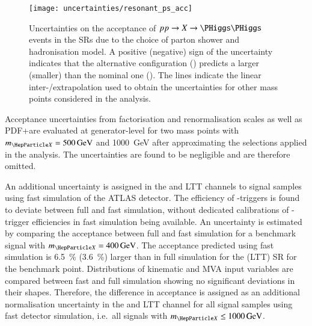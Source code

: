 
\begin{figure}[htbp]
  \centering

  \texttt{[image: uncertainties/resonant\_ps\_acc]}

  \caption[Uncertainties on the acceptance of $pp \to X \to \HH$ events in the
  SRs due to the choice of parton shower and hadronisation model.]{Uncertainties
    on the acceptance of $pp \to X \to \HH$ events in the SRs due to the choice
    of parton shower and hadronisation model. A positive (negative) sign of the
    uncertainty indicates that the alternative configuration (\PYTHIA) predicts
    a larger (smaller) \AccTimesEff than the nominal one (\HERWIG). The lines
    indicate the linear inter-/extrapolation used to obtain the uncertainties
    for other mass points considered in the analysis.}%
  \label{fig:resonant_partonshower}
\end{figure}

Acceptance uncertainties from factorisation and renormalisation scales as well
as PDF+\alphas are evaluated at generator-level for two mass points with
$\mX = \SI{500}{\GeV}$ and \SI{1000}{\GeV} after approximating the selections
applied in the analysis. The uncertainties are found to be negligible and are
therefore omitted.

An additional uncertainty is assigned in the \hadhad and \lephad LTT channels to
signal samples using fast simulation of the ATLAS detector. The efficiency of
\tauhadvis-triggers is found to deviate between full and fast simulation,
without dedicated calibrations of \tauhadvis-trigger efficiencies in fast
simulation being available. An uncertainty is estimated by comparing the
acceptance between full and fast simulation for a benchmark signal with
$\mX = \SI{400}{\GeV}$. The acceptance predicted using fast simulation is
\SI{6.5}{\percent} (\SI{3.6}{\percent}) larger than in full simulation for the
\hadhad (\lephad LTT) SR for the benchmark point. Distributions of kinematic and
MVA input variables are compared between fast and full simulation showing no
significant deviations in their shapes. Therefore, the difference in acceptance
is assigned as an additional normalisation uncertainty in the \hadhad and
\lephad LTT channel for all signal samples using fast detector simulation, i.e.\
all signals with $\mX \leq \SI{1000}{\GeV}$.

